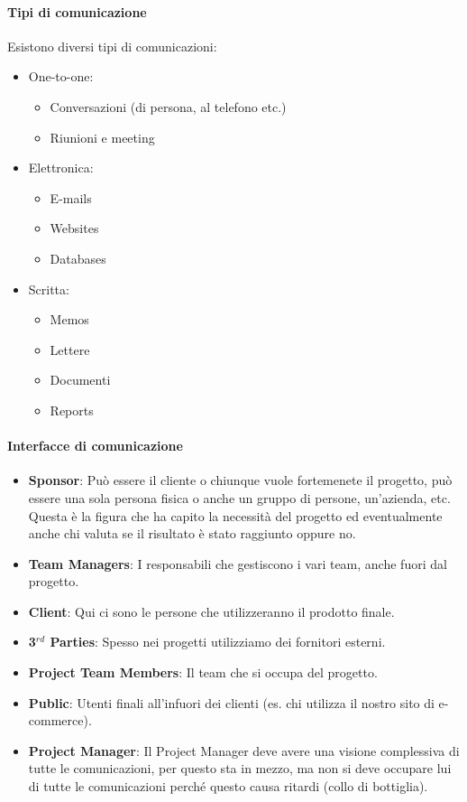 \paragraph{Tipi di comunicazione}
Esistono diversi tipi di comunicazioni:
\begin{itemize}
	\item One-to-one:
	\begin{itemize}
		\item Conversazioni (di persona, al telefono etc.)
		\item Riunioni e meeting
	\end{itemize}
	\item Elettronica:
	\begin{itemize}
		\item E-mails
		\item Websites
		\item Databases
	\end{itemize}
	\item Scritta:
	\begin{itemize}
		\item Memos
		\item Lettere
		\item Documenti
		\item Reports
	\end{itemize}
\end{itemize}
\paragraph{Interfacce di comunicazione}
\begin{itemize}
	\item \textbf{Sponsor}: Può essere il cliente o chiunque vuole fortemenete il progetto, può essere una sola persona fisica o anche un gruppo di persone, un'azienda, etc.\newline
	Questa è la figura che ha capito la necessità del progetto ed eventualmente anche chi valuta se il risultato è stato raggiunto oppure no.
	\item \textbf{Team Managers}: I responsabili che gestiscono i vari team, anche fuori dal progetto.
	\item \textbf{Client}: Qui ci sono le persone che utilizzeranno il prodotto finale.
	\item \textbf{3$^{rd}$ Parties}: Spesso nei progetti utilizziamo dei fornitori esterni.
	\item \textbf{Project Team Members}: Il team che si occupa del progetto.
	\item \textbf{Public}: Utenti finali all'infuori dei clienti (es. chi utilizza il nostro sito di e-commerce).
	\item \textbf{Project Manager}: Il Project Manager deve avere una visione complessiva di tutte le comunicazioni, per questo sta in mezzo, ma non si deve occupare lui di tutte le comunicazioni perché questo causa ritardi (collo di bottiglia).
\end{itemize}
